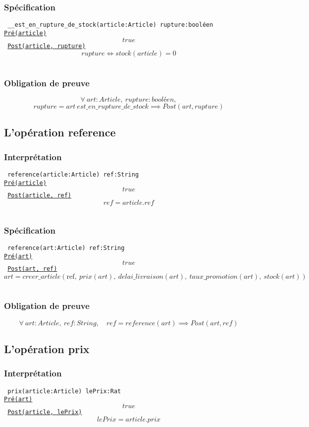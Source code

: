 \documentclass{article}
\begin{document}
\subsubsection{Spécification}
{\tt
\_\_est\_en\_rupture\_de\_stock(article:Article)  rupture:booléen\\
\underline{Pré(article)}
$$ true$$
\underline{Post(article, rupture)}
$$ rupture \Leftrightarrow stock(article) = 0$$
}

\subsubsection{Obligation de preuve}
$$ \forall\ art:Article,\ rupture:booléen,$$
$$ rupture = art\ est\_en\_rupture\_de\_stock \implies Post(art, rupture) $$

\subsection{L'opération reference}
\subsubsection{Interprétation}
{\tt
reference(article:Article)  ref:String\\
\underline{Pré(article)}
$$ true $$
\underline{Post(article, ref)}
$$ ref = article.ref $$
}

\subsubsection{Spécification}
{\tt
reference(art:Article)  ref:String\\
\underline{Pré(art)}
$$ true $$
\underline{Post(art, ref)}
$$ art = creer\_article(\text{ref},\ prix(art),\ delai\_livraison(art),\ taux\_promotion(art),\ stock(art)) $$
}

\subsubsection{Obligation de preuve}
$$ \forall\ art:Article,\ ref:String,\quad ref = reference(art) \implies Post(art,ref) $$

\subsection{L'opération prix}
\subsubsection{Interprétation}
{\tt
prix(article:Article)  lePrix:Rat\\
\underline{Pré(art)}
$$ true $$
\underline{Post(article, lePrix)}
$$ lePrix = article.prix $$
}
\end{document}
